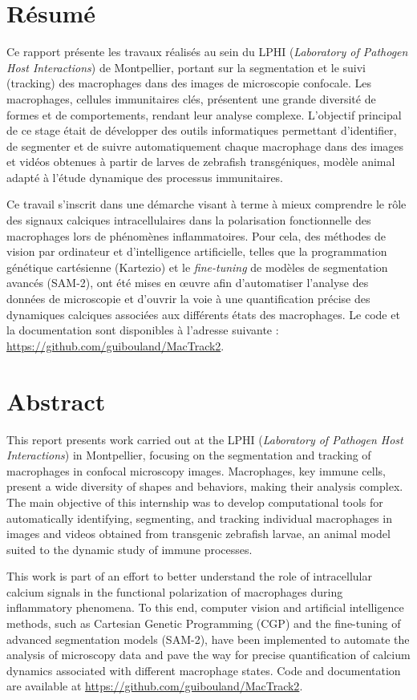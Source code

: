 \documentclass[a4paper,12pt]{report}
\begin{document}
\clearpage
{}
\section*{Résumé}
Ce rapport présente les travaux réalisés au sein du LPHI (\textit{Laboratory of Pathogen Host Interactions}) de Montpellier, portant sur la segmentation et le suivi (tracking) des macrophages dans des images de microscopie confocale. Les macrophages, cellules immunitaires clés, présentent une grande diversité de formes et de comportements, rendant leur analyse complexe. L'objectif principal de ce stage était de développer des outils informatiques permettant d'identifier, de segmenter et de suivre automatiquement chaque macrophage dans des images et vidéos obtenues à partir de larves de zebrafish transgéniques, modèle animal adapté à l'étude dynamique des processus immunitaires.

Ce travail s'inscrit dans une démarche visant à terme à mieux comprendre le rôle des signaux calciques intracellulaires dans la polarisation fonctionnelle des macrophages lors de phénomènes inflammatoires. Pour cela, des méthodes de vision par ordinateur et d'intelligence artificielle, telles que la programmation génétique cartésienne (Kartezio) et le \textit{fine-tuning} de modèles de segmentation avancés (SAM-2), ont été mises en œuvre afin d'automatiser l'analyse des données de microscopie et d'ouvrir la voie à une quantification précise des dynamiques calciques associées aux différents états des macrophages. Le code et la documentation sont disponibles à l'adresse suivante : \url{https://github.com/guibouland/MacTrack2}.
\vspace{2em}
\section*{Abstract}
This report presents work carried out at the LPHI (\textit{Laboratory of Pathogen Host Interactions}) in Montpellier, focusing on the segmentation and tracking of macrophages in confocal microscopy images. Macrophages, key immune cells, present a wide diversity of shapes and behaviors, making their analysis complex. The main objective of this internship was to develop computational tools for automatically identifying, segmenting, and tracking individual macrophages in images and videos obtained from transgenic zebrafish larvae, an animal model suited to the dynamic study of immune processes.

This work is part of an effort to better understand the role of intracellular calcium signals in the functional polarization of macrophages during inflammatory phenomena. To this end, computer vision and artificial intelligence methods, such as Cartesian Genetic Programming (CGP) and the fine-tuning of advanced segmentation models (SAM-2), have been implemented to automate the analysis of microscopy data and pave the way for precise quantification of calcium dynamics associated with different macrophage states. Code and documentation are available at \url{https://github.com/guibouland/MacTrack2}.
\end{document}
